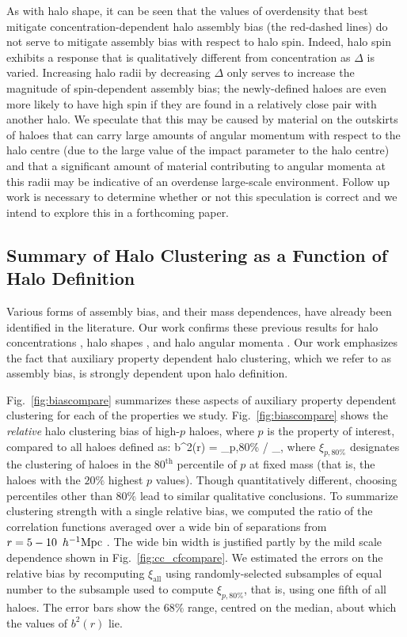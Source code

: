 \documentclass[usenatbib,fleqn]{mnras}
\begin{document}
As with halo shape, it can be seen that the values of overdensity that best mitigate concentration-dependent halo assembly bias (the red-dashed lines) do not serve to mitigate assembly bias with respect to halo spin. Indeed, halo spin exhibits a response that is qualitatively different from concentration as $\Delta$ is varied. Increasing halo radii by decreasing $\Delta$ only serves to increase the magnitude of spin-dependent assembly bias; the newly-defined haloes are even more likely to have high spin if they are found in a relatively close pair with another halo. We speculate that this may be caused by material on the outskirts of haloes that can carry large amounts of angular momentum with respect to the halo centre (due to the large value of the impact parameter to the halo centre) and that a significant amount of material contributing to angular momenta at this radii may be indicative of an overdense large-scale environment. Follow up work is necessary to determine whether or not this speculation is correct and we intend to explore this in a forthcoming paper.

\subsection{Summary of Halo Clustering as a Function of Halo Definition}

Various forms of assembly bias, and their mass dependences, have already been identified in the literature. Our work confirms these previous results for halo concentrations \citep{wechsler_etal06,faltenbacher_white10,sunayama_etal16}, halo shapes \citep{bett_etal07,hahn_etal07b,hahn_etal07b,faltenbacher_white10,lacerna_padilla12,vandaalen_etal12}, and halo angular momenta  \citep{bett_etal07,hahn_etal07a,hahn_etal07b,lacerna_padilla12}. Our work emphasizes the fact that auxiliary property dependent halo clustering, which we refer to as assembly bias, is strongly dependent upon halo definition. 

Fig.~\ref{fig:biascompare} summarizes these aspects of auxiliary property dependent clustering for each of the properties we study. Fig.~\ref{fig:biascompare} shows the {\em relative} halo clustering bias of high-$p$ haloes, where $p$ is the property of interest, compared to all haloes defined as: 
\beq
b^2(r) = \xi_{p,80\%} / \xi_{},
\eeq
%
where $\xi_{p,80\%}$ designates the clustering of haloes in the $80^{\mathrm{th}}$ percentile of $p$ at fixed mass (that is, the haloes with the $20\%$ highest $p$ values). Though quantitatively different, choosing percentiles other than $80\%$ lead to similar qualitative conclusions. To summarize clustering strength with a single relative bias, we computed the ratio of the correlation functions averaged over a wide bin of separations from $r = 5-10\, \ h^{-1}\mathrm{Mpc}~$. The wide bin width is justified partly by the mild scale dependence shown in Fig.~\ref{fig:cc_cfcompare}. We estimated the errors on the relative bias by recomputing $\xi_{\mathrm{all}}$ using randomly-selected subsamples of equal number to the subsample used to compute $\xi_{p,80\%}$, that is, using one fifth of all haloes. The error bars show the $68\%$ range, centred on the median, about which the values of $b^2(r)$ lie. 
\end{document}

